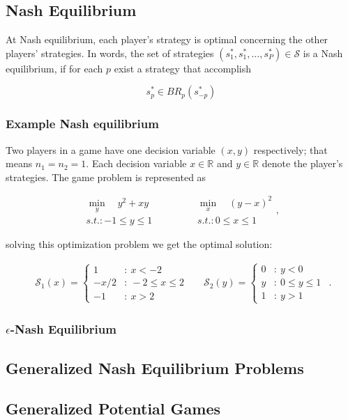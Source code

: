 \subsection{Nash Equilibrium}


At Nash equilibrium, each player's strategy is optimal concerning the other players' strategies. In words, the set of strategies $(s_1^*,s_1^*, ... ,s_P^*) \in \mathcal{S}$ is a Nash equilibrium, if for each $p$ exist a strategy that accomplish 

\begin{equation*}
    s_p^* \in BR_p(s^*_{-p})
\end{equation*}


\subsubsection{Example Nash equilibrium}
Two players in a game have one decision variable $(x,y)$ respectively; that means $n_1=n_2=1$. Each decision variable $x \in \mathbb{R}$ and $y \in \mathbb{R}$ denote the player's strategies.
The game problem is represented as 

\begin{equation}
\begin{matrix}
\min_y \quad y^2 + xy & \ & \qquad & \min_x \quad (y-x)^2 \\
s.t.: -1 \le  y \le 1 & \ & \qquad & s.t.: 0 \le  x \le 1
\end{matrix},
\end{equation}

solving this optimization problem we get the optimal solution:

\begin{equation}
\begin{matrix}
\mathcal{S}_1(x) = \left\{ \begin{array}{cl}
1 & : \ x  < -2 \\
-x/2 & : \ -2 \leq x \leq 2 \\
-1 & : \ x > 2
\end{array} \right. 

& &

\mathcal{S}_2(y) = \left\{ \begin{array}{cl}
0 & : \ y  < 0 \\
y & : \ 0 \leq y \leq 1 \\
1 & : \ y > 1
\end{array} \right.
\end{matrix}.
\end{equation}



\subsubsection{$\epsilon$-Nash Equilibrium}

\subsection{Generalized Nash Equilibrium Problems}


\subsection{Generalized Potential Games}


